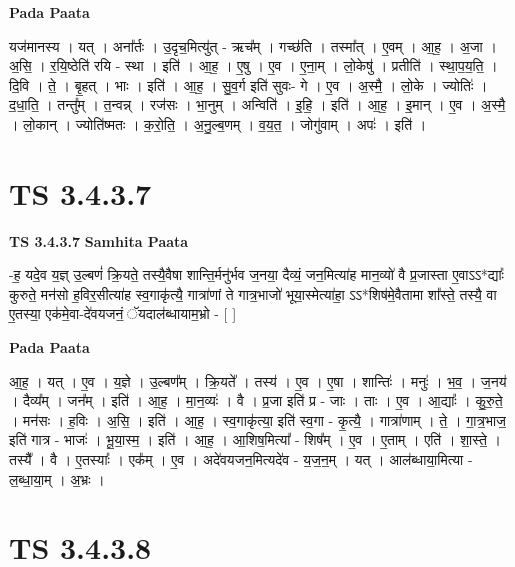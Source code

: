 \documentclass[17pt]{extarticle}
\begin{document}
\textbf{Pada Paata} \newline

यज॑मानस्य । यत् । अना᳚र्तः । उ॒दृच॒मित्यु॑त् - ऋच᳚म् । गच्छ॑ति । तस्मा᳚त् । ए॒वम् । आ॒ह॒ । अ॒जा । अ॒सि॒ । र॒यि॒ष्ठेति॑ रयि - स्था । इति॑ । आ॒ह॒ । ए॒षु । ए॒व । ए॒ना॒म् । लो॒केषु॑ । प्रतीति॑ । स्था॒प॒य॒ति॒ । दि॒वि । ते॒ । बृ॒हत् । भाः । इति॑ । आ॒ह॒ । सु॒व॒र्ग इति॑ सुवः- गे । ए॒व । अ॒स्मै॒ । लो॒के । ज्योतिः॑ । द॒धा॒ति॒ । तन्तु᳚म् । त॒न्वन्न् । रज॑सः । भा॒नुम् । अन्विति॑ । इ॒हि॒ । इति॑ । आ॒ह॒ । इ॒मान् । ए॒व । अ॒स्मै॒ । लो॒कान् । ज्योति॑ष्मतः । क॒रो॒ति॒ । अ॒नु॒ल्ब॒णम् । व॒य॒त॒ । जोगु॑वाम् । अपः॑ । इति॑ ।  \newline





\section{ TS 3.4.3.7 }

\textbf{TS 3.4.3.7 } \newline
\textbf{Samhita Paata} \newline

-ह॒ यदे॒व य॒ज्ञ् उ॒ल्बणं॑ क्रि॒यते॒ तस्यै॒वैषा शान्ति॒र्मनु॑र्भव ज॒नया॒ दैव्यं॒ जन॒मित्या॑ह मान॒व्यो॑ वै प्र॒जास्ता ए॒वाऽऽ*द्याः᳚ कुरुते॒ मन॑सो ह॒विर॒सीत्या॑ह स्व॒गाकृ॑त्यै॒ गात्रा॑णां ते गात्र॒भाजो॑ भूया॒स्मेत्या॑हा॒ ऽऽ*शिष॑मे॒वैतामा शा᳚स्ते॒ तस्यै॒ वा ए॒तस्या॒ एक॑मे॒वा-दे॑वयजनं॒ ॅयदाल॑ब्धायाम॒भ्रो - [  ] \newline

\textbf{Pada Paata} \newline

आ॒ह॒ । यत् । ए॒व । य॒ज्ञे । उ॒ल्बण᳚म् । क्रि॒यते᳚ । तस्य॑ । ए॒व । ए॒षा । शान्तिः॑ । मनुः॑ । भ॒व॒ । ज॒नय॑ । दैव्य᳚म् । जन᳚म् । इति॑ । आ॒ह॒ । मा॒न॒व्यः॑ । वै । प्र॒जा इति॑ प्र - जाः । ताः । ए॒व । आ॒द्याः᳚ । कु॒रु॒ते॒ । मन॑सः । ह॒विः । अ॒सि॒ । इति॑ । आ॒ह॒ । स्व॒गाकृ॑त्या॒ इति॑ स्व॒गा - कृ॒त्यै॒ । गात्रा॑णाम् । ते॒ । गा॒त्र॒भाज॒ इति॑ गात्र - भाजः॑ । भू॒या॒स्म॒ । इति॑ । आ॒ह॒ । आ॒शिष॒मित्या᳚ - शिष᳚म् । ए॒व । ए॒ताम् । एति॑ । शा॒स्ते॒ । तस्यै᳚ । वै । ए॒तस्याः᳚ । एक᳚म् । ए॒व । अदे॑वयजन॒मित्यदे॑व - य॒ज॒न॒म् । यत् । आल॑ब्धाया॒मित्या - ल॒ब्धा॒या॒म् । अ॒भ्रः ।  \newline





\section{ TS 3.4.3.8 }
\end{document}
